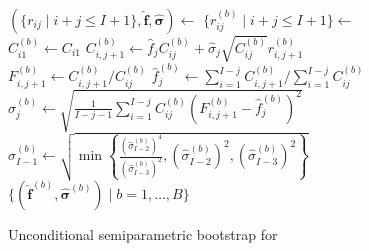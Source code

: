 \documentclass[a4paper]{book}
\begin{document}
\begin{figure}[p]
\begin{algorithm}[H]
    \caption{Unconditional semiparametric bootstrap for }
    \label{alg:uncond-semiparam-mack}
    \begin{algorithmic}
      \State $(\{ r_{ij} \mid i + j \leq I + 1 \}, \bm{\widehat{f}}, \bm{\widehat{\sigma}}) \gets$ 
        \State $\{ r^{(b)}_{ij} \mid i + j \leq I + 1 \} \gets$ 
          \State $C^{(b)}_{i1} \gets C_{i1}$
        \EndFor
            \State $C^{(b)}_{i, j + 1} \gets \widehat{f}_j C^{(b)}_{ij} + \widehat{\sigma}_j \sqrt{C^{(b)}_{ij}} r^{(b)}_{i, j + 1}$
            \State $F^{(b)}_{i, j + 1} \gets C^{(b)}_{i, j + 1} / C^{(b)}_{ij}$
          \EndFor
          \State $\widehat{f}^{(b)}_j \gets \sum_{i = 1}^{I - j} C^{(b)}_{i, j + 1} / \sum_{i = 1}^{I - j} C^{(b)}_{ij}$
            \State $\widehat{\sigma}^{(b)}_j \gets \sqrt{\frac{1}{I - j - 1}\sum_{i = 1}^{I-j} C^{(b)}_{ij}\left( F^{(b)}_{i, j + 1} - \widehat{f}^{(b)}_j \right)^2}$
          \Else
            \State $\widehat{\sigma}^{(b)}_{I - 1} \gets \sqrt{\min{ \left \{ \frac{(\widehat{\sigma}^{(b)}_{I - 2})^4}{(\widehat{\sigma}^{(b)}_{I - 3})^2}, (\widehat{\sigma}^{(b)}_{I - 2})^2, (\widehat{\sigma}^{(b)}_{I - 3})^2 \right \} }}$
          \EndIf
        \EndFor
      \EndFor
      \State \Return $\{ (\widehat{\bm{f}}^{(b)}, \widehat{\bm{\sigma}}^{(b)}) \mid b = 1, \dots, B \}$
    \end{algorithmic}
  \end{algorithm}
\end{figure}
\end{document}

